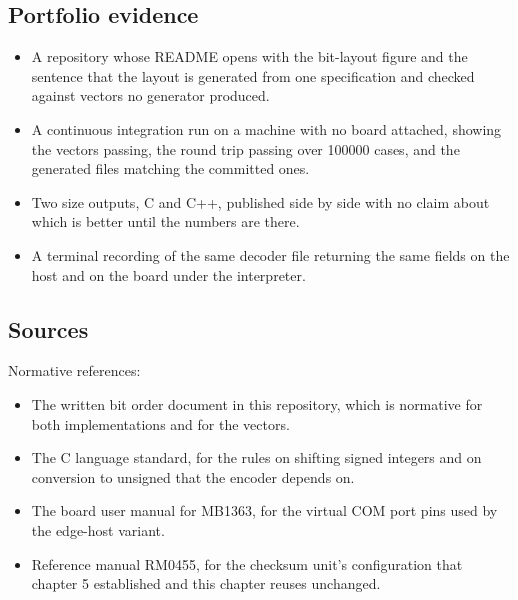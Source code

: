 \subsection*{Portfolio evidence}

\begin{itemize}
\item A repository whose README opens with the bit-layout figure and the
sentence that the layout is generated from one specification and checked against
vectors no generator produced.
\item A continuous integration run on a machine with no board attached, showing
the vectors passing, the round trip passing over 100000 cases, and the generated
files matching the committed ones.
\item Two size outputs, C and C++, published side by side with no claim about
which is better until the numbers are there.
\item A terminal recording of the same decoder file returning the same fields on
the host and on the board under the interpreter.
\end{itemize}

\subsection*{Sources}

Normative references:
\begin{itemize}
\item The written bit order document in this repository, which is normative for
both implementations and for the vectors.
\item The C language standard, for the rules on shifting signed integers and on
conversion to unsigned that the encoder depends on.
\item The board user manual for MB1363, for the virtual COM port pins used by
the edge-host variant.
\item Reference manual RM0455, for the checksum unit's configuration that
chapter 5 established and this chapter reuses unchanged.
\end{itemize}

